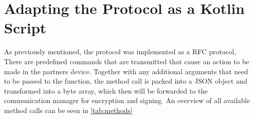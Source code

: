 \section{Adapting the Protocol as a Kotlin Script}

As previously mentioned, the protocol was implemented as a RFC protocol, There are predefined commands that are transmitted that cause an action to be made in the partners device. Together with any additional arguments that need to be passed to the function, the method call is packed into a JSON object and transformed into a byte array, which then will be forwarded to the communication manager for encryption and signing. An overview of all available method calls can be seen in \ref{tab:methods}


